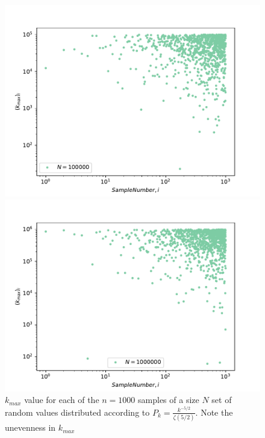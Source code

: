 \documentclass{article}
\begin{document}
\begin{figure}[H]
    \begin{minipage}{0.47\textwidth}
    \includegraphics[width=\linewidth]{Q06/kmaxVsSampleNumber_N100000.pdf}
    \end{minipage}
    \hspace{\fill} %
    \begin{minipage}{0.47\textwidth}
    \includegraphics[width=\linewidth]{Q06/kmaxVsSampleNumber_N1000000.pdf}
    \end{minipage}
    
\caption{$k_{max}$ value for each of the $n=1000$ samples of a size $N$ set of random values distributed according to $P_k = \frac{k^{-5/2}}{\zeta(5/2)}$. Note the unevenness in $k_{max}$} \label{HeyJude}
\end{figure}
\end{document}
